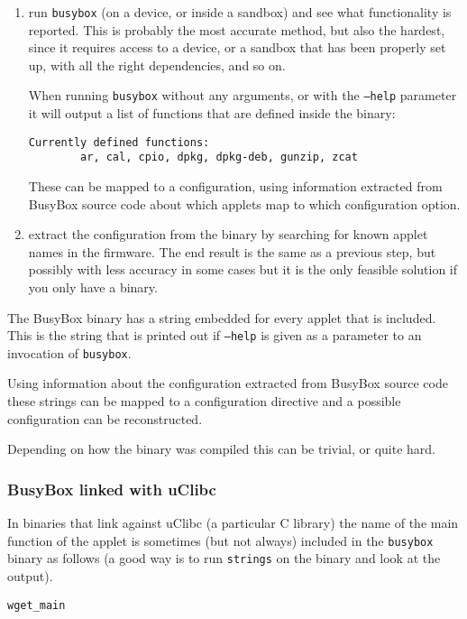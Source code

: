 \documentclass[10pt,a4paper]{article}
\begin{document}
\begin{enumerate}
\item run \texttt{busybox} (on a device, or inside a sandbox) and see what
functionality is reported. This is probably the most accurate method, but also
the hardest, since it requires access to a device, or a sandbox that has been
properly set up, with all the right dependencies, and so on.

When running \texttt{busybox} without any arguments, or with the \texttt{--help}
parameter it will output a list of functions that are defined inside the
binary:

\begin{verbatim}
Currently defined functions:
        ar, cal, cpio, dpkg, dpkg-deb, gunzip, zcat
\end{verbatim}

These can be mapped to a configuration, using information extracted from
BusyBox source code about which applets map to which configuration option.
\item extract the configuration from the binary by searching for known applet
names in the firmware. The end result is the same as a previous step, but
possibly with less accuracy in some cases but it is the only feasible solution
if you only have a binary.
\end{enumerate}

The BusyBox binary has a string embedded for every applet that is included.
This is the string that is printed out if \texttt{--help} is given as a
parameter to an invocation of \texttt{busybox}.

Using information about the configuration extracted from BusyBox source code
these strings can be mapped to a configuration directive and a possible
configuration can be reconstructed.

Depending on how the binary was compiled this can be trivial, or quite hard.

\subsubsection{BusyBox linked with uClibc}

In binaries that link against uClibc (a particular C library) the name of the
main function of the applet is sometimes (but not always) included in the
\texttt{busybox} binary as follows (a good way is to run \texttt{strings} on
the binary and look at the output).

\begin{verbatim}
wget_main
\end{verbatim}
\end{document}
